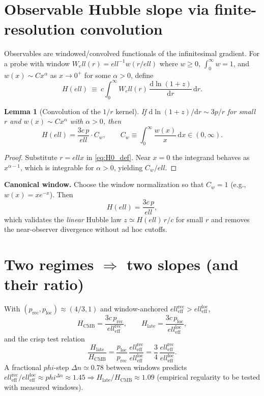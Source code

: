\documentclass[
  onecolumn,
  amsmath,amssymb,
  aps,
  prd,
  superscriptaddress,
  nofootinbib,
  longbibliography
]{revtex4-2}
\newtheorem{lemma}{Lemma}
\newcommand{\vp}{\varphi}
\newcommand{\ellRec}{\ell_{\mathrm{eff}}^{\mathrm{rec}}}
\newcommand{\ellLoc}{\ell_{\mathrm{eff}}^{\mathrm{loc}}}
\newcommand{\pRec}{p_{\mathrm{rec}}}
\newcommand{\pLoc}{p_{\mathrm{loc}}}
\newcommand{\Hlate}{H_{\mathrm{late}}}
\newcommand{\HCMB}{H_{\mathrm{CMB}}}
\def\varphi{phi}%
\def\ell{ell}%
\begin{document}
\section{Observable Hubble slope via finite-resolution convolution}
Observables are windowed/convolved functionals of the infinitesimal gradient. For a probe with window $W_\ell(r)=\ell^{-1}w(r/\ell)$ where $w\ge0$, $\int_0^\infty w=1$, and $w(x)\sim Cx^\alpha$ as $x\to 0^+$ for some $\alpha>0$, define
\begin{equation}
\label{eq:H0_def}
H(\ell)\ \equiv\ c\int_0^\infty\! W_\ell(r)\,\frac{\mathrm{d}\ln(1+z)}{\mathrm{d} r}\,\mathrm{d}r.
\end{equation}

\begin{lemma}[Convolution of the $1/r$ kernel]
\label{lem:conv}
If $\mathrm{d}\ln(1+z)/\mathrm{d} r\sim 3p/r$ for small $r$ and $w(x)\sim Cx^\alpha$ with $\alpha>0$, then
\begin{equation}
H(\ell)=\frac{3c\,p}{\ell}\cdot C_w,\qquad C_w\equiv\int_0^\infty\!\frac{w(x)}{x}\,\mathrm{d}x\in(0,\infty).
\end{equation}
\end{lemma}
\begin{proof}
Substitute $r=\ell x$ in \eqref{eq:H0_def}. Near $x=0$ the integrand behaves as $x^{\alpha-1}$, which is integrable for $\alpha>0$, yielding $C_w/\ell$.
\end{proof}

\noindent
\textbf{Canonical window.} Choose the window normalization so that $C_w=1$ (e.g., $w(x)=x e^{-x}$). Then
\begin{equation}
\label{eq:H0_working}
H(\ell)=\frac{3c\,p}{\ell},
\end{equation}
which validates the \emph{linear} Hubble law $z\simeq H(\ell)\, r/c$ for small $r$ and removes the near-observer divergence without ad hoc cutoffs.

\section{Two regimes $\Rightarrow$ two slopes (and their ratio)}
With $(\pRec,\pLoc)\approx(4/3,1)$ and window-anchored $\ellRec>\ellLoc$,
\begin{equation}
\label{eq:twoH}
\HCMB=\frac{3c\,\pRec}{\ellRec},\qquad
\Hlate=\frac{3c\,\pLoc}{\ellLoc},
\end{equation}
and the crisp test relation
\begin{equation}
\label{eq:ratio}
\frac{\Hlate}{\HCMB}
=\frac{\pLoc}{\pRec}\,\frac{\ellRec}{\ellLoc}
=\frac{3}{4}\,\frac{\ellRec}{\ellLoc}.
\end{equation}
A fractional $\vp$-step $\Delta n\simeq 0.78$ between windows predicts $\ellRec/\ellLoc\approx \vp^{\Delta n}\approx 1.45\Rightarrow \Hlate/\HCMB\approx 1.09$ (empirical regularity to be tested with measured windows).
\end{document}
